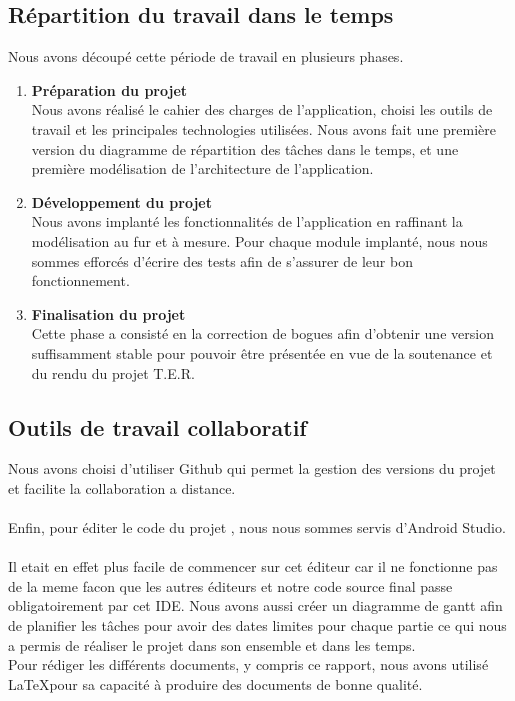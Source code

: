 \documentclass{article}
\begin{document}
\subsection{Répartition du travail dans le temps}

Nous avons découpé cette période de travail en plusieurs phases.
\begin{enumerate}
    \item \textbf{Préparation du projet}\\
          Nous avons réalisé le cahier des charges de l’application, choisi les
          outils de travail et les principales technologies utilisées. Nous avons fait une première version
          du diagramme de répartition des tâches dans le temps, et une première modélisation de
          l’architecture de l’application.
\item \textbf{Développement du projet}\\
Nous avons implanté les fonctionnalités de l’application en
raffinant la modélisation au fur et à mesure. Pour chaque module implanté, nous nous sommes
efforcés d’écrire des tests afin de s’assurer de leur bon fonctionnement.
\item \textbf{Finalisation du projet}\\
Cette phase a consisté en la correction de bogues afin d’obtenir une
version suffisamment stable pour pouvoir être présentée en vue de la soutenance et du rendu
du projet T.E.R.
\end{enumerate}
\newpage

\subsection{Outils de travail collaboratif }
Nous avons choisi d’utiliser Github qui  permet la gestion des versions du projet et facilite la collaboration a distance.\\\\
Enfin, pour éditer le code du projet , nous nous sommes servis d'Android Studio.\\\\
Il etait en effet plus facile de commencer sur cet éditeur car il ne fonctionne pas de la meme facon que les autres éditeurs et notre code source final passe obligatoirement par cet IDE.
Nous avons aussi créer un diagramme de gantt afin de planifier les tâches pour avoir des dates limites pour chaque partie ce qui nous a permis de réaliser le projet dans son ensemble et dans les temps.\\
\newline Pour rédiger les différents documents, y compris ce rapport, nous
avons utilisé \LaTeX  pour sa capacité à produire des documents de bonne qualité.
\end{document}
